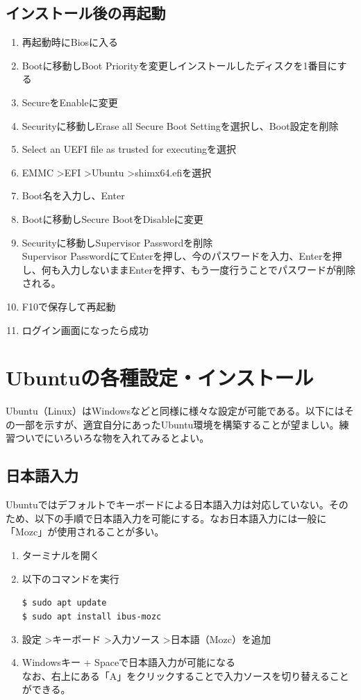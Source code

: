 \documentclass[a4paper, 11pt, dvipdfmx]{jsarticle}
\begin{document}
\subsection{インストール後の再起動}
  \begin{enumerate}
    \item 再起動時にBiosに入る
    \item Bootに移動しBoot Priorityを変更しインストールしたディスクを1番目にする
    \item SecureをEnableに変更
    \item Securityに移動しErase all Secure Boot Settingを選択し、Boot設定を削除
    \item Select an UEFI file as trusted for executingを選択
    \item EMMC \textgreater EFI \textgreater Ubuntu \textgreater shimx64.efiを選択
    \item Boot名を入力し、Enter
    \item Bootに移動しSecure BootをDisableに変更
    \item Securityに移動しSupervisor Passwordを削除\\
    Supervisor PasswordにてEnterを押し、今のパスワードを入力、Enterを押し、何も入力しないままEnterを押す、もう一度行うことでパスワードが削除される。
    \item F10で保存して再起動
    \item ログイン画面になったら成功
  \end{enumerate}

\section{Ubuntuの各種設定・インストール}
Ubuntu（Linux）はWindowsなどと同様に様々な設定が可能である。以下にはその一部を示すが、適宜自分にあったUbuntu環境を構築することが望ましい。練習ついでにいろいろな物を入れてみるとよい。
\subsection{日本語入力}
  Ubuntuではデフォルトでキーボードによる日本語入力は対応していない。そのため、以下の手順で日本語入力を可能にする。なお日本語入力には一般に「Mozc」が使用されることが多い。
  \begin{enumerate}
    \item ターミナルを開く
    \item 以下のコマンドを実行
    \begin{terminalbox}
      \verb|$ sudo apt update|\\
      \verb|$ sudo apt install ibus-mozc|
    \end{terminalbox}
    \item 設定 \textgreater キーボード \textgreater 入力ソース \textgreater 日本語（Mozc）を追加
    \item Windowsキー + Spaceで日本語入力が可能になる\\
    なお、右上にある「A」をクリックすることで入力ソースを切り替えることができる。
  \end{enumerate}
\end{document}

